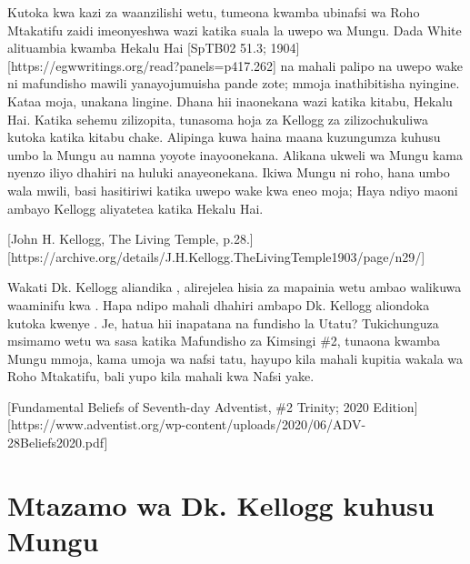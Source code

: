 Kutoka kwa kazi za waanzilishi wetu, tumeona kwamba ubinafsi wa Roho Mtakatifu zaidi imeonyeshwa wazi katika suala la uwepo wa Mungu. Dada White alituambia kwamba Hekalu Hai [SpTB02 51.3; 1904][https://egwwritings.org/read?panels=p417.262]  na mahali palipo na uwepo wake ni mafundisho mawili yanayojumuisha pande zote; mmoja inathibitisha nyingine. Kataa moja, unakana lingine. Dhana hii inaonekana wazi katika kitabu, Hekalu Hai. Katika sehemu zilizopita, tunasoma hoja za Kellogg za  zilizochukuliwa kutoka katika kitabu chake. Alipinga kuwa haina maana kuzungumza kuhusu umbo la Mungu au namna yoyote inayoonekana. Alikana ukweli wa Mungu kama nyenzo iliyo dhahiri na huluki anayeonekana. Ikiwa Mungu ni roho, hana umbo wala mwili, basi hasitiriwi katika uwepo wake kwa eneo moja; Haya ndiyo maoni ambayo Kellogg aliyatetea katika Hekalu Hai.


[John H. Kellogg, The Living Temple, p.28.][https://archive.org/details/J.H.Kellogg.TheLivingTemple1903/page/n29/]


Wakati Dk. Kellogg aliandika , alirejelea hisia za mapainia wetu ambao walikuwa waaminifu kwa . Hapa ndipo mahali dhahiri ambapo Dk. Kellogg aliondoka kutoka kwenye . Je, hatua hii inapatana na fundisho la Utatu? Tukichunguza msimamo wetu wa sasa katika Mafundisho za Kimsingi \#2, tunaona kwamba Mungu mmoja, kama umoja wa nafsi tatu, hayupo kila mahali kupitia wakala wa Roho Mtakatifu, bali yupo kila mahali kwa Nafsi yake.


[Fundamental Beliefs of Seventh-day Adventist, \#2 Trinity; 2020 Edition][https://www.adventist.org/wp-content/uploads/2020/06/ADV-28Beliefs2020.pdf]


\section*{Mtazamo wa Dk. Kellogg kuhusu Mungu}


